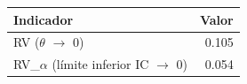 \begin{tabular}{lr}
\toprule
Indicador & Valor \\
\midrule
RV ($\theta$ $\rightarrow$ 0) & 0.105 \\
RV\_$\alpha$ (límite inferior IC $\rightarrow$ 0) & 0.054 \\
\bottomrule
\end{tabular}